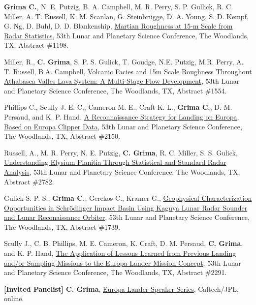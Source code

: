 \begin{etaremune}
\item
  \textbf{Grima C.}, N. E. Putzig, B. A. Campbell, M. R. Perry, S. P. Gullick, R. C. Miller, A. T. Russell, K. M. Scanlan, G. Steinbrügge, D. A. Young, S. D. Kempf, G. Ng, D. Buhl, D. D. Blankenship, \href{https://www.hou.usra.edu/meetings/lpsc2022/pdf/1198.pdf}{Martian Roughness at 15-m Scale from Radar Statistics}, 53th Lunar and Planetary Science Conference, The Woodlands, TX, Abstract \#1198.
\item
  Miller, R., \textbf{C. Grima}, S. P. S. Gulick, T. Goudge, N.E. Putzig, M.R. Perry, A. T. Russell, B.A. Campbell,  \href{https://www.hou.usra.edu/meetings/lpsc2022/pdf/1554.pdf}{Volcanic Facies and 15m Scale Roughness Throughout Athabasca Valles Lava System: A Multi-Stage Flow Development}, 53th Lunar and Planetary Science Conference, The Woodlands, TX, Abstract \#1554.
\item
  Phillips C., Scully J. E. C., Cameron M. E., Craft K. L., \textbf{Grima C.}, D. M. Persaud, and K. P. Hand, \href{https://www.hou.usra.edu/meetings/lpsc2022/pdf/2150.pdf}{A Reconnaissance Strategy for Landing on Europa, Based on Europa Clipper Data}, 53th Lunar and Planetary Science Conference, The Woodlands, TX, Abstract \#2150.
\item
  Russell, A., M. R. Perry, N. E. Putzig, \textbf{C. Grima}, R. C. Miller, S. S. Gulick, \href{https://www.hou.usra.edu/meetings/lpsc2022/pdf/2782.pdf}{Understanding Elysium Planitia Through Statistical and Standard Radar Analysis}, 53th Lunar and Planetary Science Conference, The Woodlands, TX, Abstract \#2782.
\item
  Gulick S. P. S., \textbf{Grima C.}, Gerekos C., Kramer G., \href{http://www.hou.usra.edu/meetings/lpsc2022/pdf/1739.pdf}{Geophysical Characterization Opportunities in Schrödinger Impact Basin Using Kaguya Lunar Radar Sounder and Lunar Reconaissance Orbiter}, 53th Lunar and Planetary Science Conference, The Woodlands, TX, Abstract \#1739.
\item
  Scully J., C. B. Phillips, M. E. Cameron, K. Craft, D. M. Persaud, \textbf{C. Grima}, and K. P. Hand, \href{https://www.hou.usra.edu/meetings/lpsc2022/pdf/2291.pdf}{The Application of Lessons Learned from Previous Landing and/or Sampling Missions to the Europa Lander Mission Concept}, 53th Lunar and Planetary Science Conference, The Woodlands, TX, Abstract \#2291.
\item
  \textbf{[Invited Panelist] C. Grima}, \href{https://www.europa-insitu.caltech.edu/presentations.html}{Europa Lander Speaker Series}, Caltech/JPL, online.


\end{etaremune}

